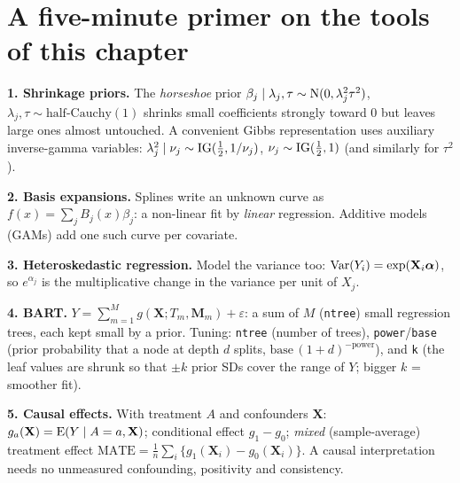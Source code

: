 \documentclass[11pt]{article}
\begin{document}
\section*{A five-minute primer on the tools of this chapter}

\begin{recall}
\textbf{1. Shrinkage priors.} The \emph{horseshoe} prior $\beta_j\mid\lambda_j,\tau\sim\mathrm{N}(0,\lambda_j^2\tau^2)$, $\lambda_j,\tau\sim\text{half-Cauchy}(1)$ shrinks small coefficients strongly toward 0 but leaves large ones almost untouched. A convenient Gibbs representation uses auxiliary inverse-gamma variables: $\lambda_j^2\mid\nu_j\sim\mathrm{IG}(\frac12,1/\nu_j)$, $\nu_j\sim\mathrm{IG}(\frac12,1)$ (and similarly for $\tau^2$).

\medskip
\textbf{2. Basis expansions.} Splines write an unknown curve as $f(x)=\sum_jB_j(x)\beta_j$: a non-linear fit by \emph{linear} regression. Additive models (GAMs) add one such curve per covariate.

\medskip
\textbf{3. Heteroskedastic regression.} Model the variance too: $\mathrm{Var}(Y_i)=\exp(\mathbf X_i\bm\alpha)$, so $e^{\alpha_j}$ is the multiplicative change in the variance per unit of $X_j$.

\medskip
\textbf{4. BART.} $Y=\sum_{m=1}^{M}g(\mathbf X;T_m,\mathbf M_m)+\varepsilon$: a sum of $M$ (\texttt{ntree}) small regression trees, each kept small by a prior. Tuning: \texttt{ntree} (number of trees), \texttt{power}/\texttt{base} (prior probability that a node at depth $d$ splits, $\text{base}\,(1+d)^{-\text{power}}$), and \texttt{k} (the leaf values are shrunk so that $\pm k$ prior SDs cover the range of $Y$; bigger $k$ = smoother fit).

\medskip
\textbf{5. Causal effects.} With treatment $A$ and confounders $\mathbf X$: $g_a(\mathbf X)=\mathrm{E}(Y\mid A=a,\mathbf X)$; conditional effect $g_1-g_0$; \emph{mixed} (sample-average) treatment effect $\text{MATE}=\frac1n\sum_i\{g_1(\mathbf X_i)-g_0(\mathbf X_i)\}$. A causal interpretation needs no unmeasured confounding, positivity and consistency.
\end{recall}

\clearpage

\end{document}
